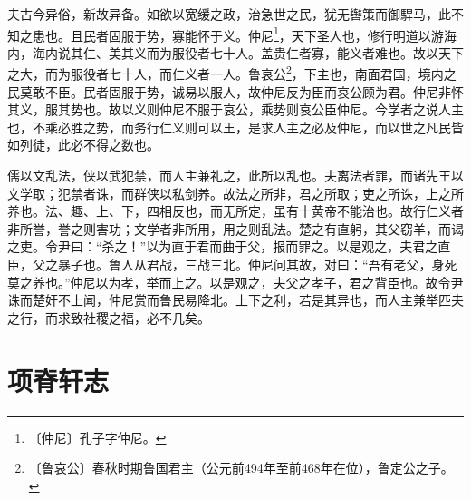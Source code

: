\documentclass[12pt,UTF-8,openany]{ctexbook}
\begin{document}
\begin{normalsize}
    夫古今异俗，新故异备。如欲以宽缓之政，治急世之民，犹无辔策而御駻马，此不知之患也。且民者固服于势，寡能怀于义。仲尼\footnote{〔仲尼〕孔子字仲尼。}，天下圣人也，修行明道以游海内，海内说其仁、美其义而为服役者七十人。盖贵仁者寡，能义者难也。故以天下之大，而为服役者七十人，而仁义者一人。鲁哀公\footnote{〔鲁哀公〕春秋时期鲁国君主（公元前494年至前468年在位），鲁定公之子。}，下主也，南面君国，境内之民莫敢不臣。民者固服于势，诚易以服人，故仲尼反为臣而哀公顾为君。仲尼非怀其义，服其势也。故以义则仲尼不服于哀公，乘势则哀公臣仲尼。今学者之说人主也，不乘必胜之势，而务行仁义则可以王，是求人主之必及仲尼，而以世之凡民皆如列徒，此必不得之数也。
    
    儒以文乱法，侠以武犯禁，而人主兼礼之，此所以乱也。夫离法者罪，而诸先王以文学取；犯禁者诛，而群侠以私剑养。故法之所非，君之所取；吏之所诛，上之所养也。法、趣、上、下，四相反也，而无所定，虽有十黄帝不能治也。故行仁义者非所誉，誉之则害功；文学者非所用，用之则乱法。楚之有直躬，其父窃羊，而谒之吏。令尹曰：“杀之！”以为直于君而曲于父，报而罪之。以是观之，夫君之直臣，父之暴子也。鲁人从君战，三战三北。仲尼问其故，对曰：“吾有老父，身死莫之养也。”仲尼以为孝，举而上之。以是观之，夫父之孝子，君之背臣也。故令尹诛而楚奸不上闻，仲尼赏而鲁民易降北。上下之利，若是其异也，而人主兼举匹夫之行，而求致社稷之福，必不几矣。
\end{normalsize}



\chapter{项脊轩志}
\end{document}
